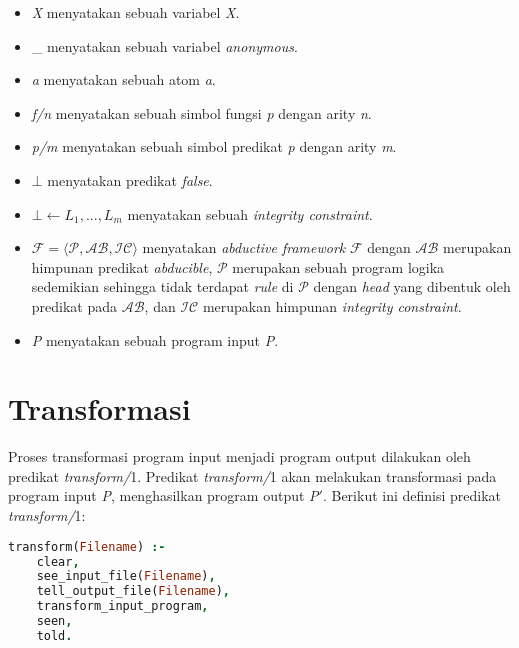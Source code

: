 \begin{itemize}
	\item \textit{X} menyatakan sebuah variabel \textit{X}.
	\item \_ menyatakan sebuah variabel \textit{anonymous}.
	\item \textit{a} menyatakan sebuah atom \textit{a}.
	\item \textit{f/}\textit{n} menyatakan sebuah simbol fungsi \textit{p} dengan arity \textit{n}.
	\item \textit{p/}\textit{m} menyatakan sebuah simbol predikat \textit{p} dengan arity \textit{m}.
	\item $\bot$ menyatakan predikat \textit{false}.
	\item $\bot \leftarrow L_1,...,L_m$ menyatakan sebuah \textit{integrity constraint}.
	\item $\mathcal{F} = \big \langle \mathcal{P}, \mathcal{AB}, \mathcal{IC} \big \rangle$ menyatakan \textit{abductive framework} $\mathcal{F}$ dengan $\mathcal{AB}$ merupakan himpunan predikat \textit{abducible}, $\mathcal{P}$ merupakan sebuah program logika sedemikian sehingga tidak terdapat \textit{rule} di $\mathcal{P}$ dengan \textit{head} yang dibentuk oleh predikat pada $\mathcal{AB}$, dan $\mathcal{IC}$ merupakan himpunan \textit{integrity constraint}.
	\item \textit{P} menyatakan sebuah program input \textit{P}.
\end{itemize}

\section{Transformasi}

Proses transformasi program input menjadi program output dilakukan oleh predikat \textit{transform/}1. Predikat \textit{transform/}1 akan melakukan transformasi pada program input \textit{P}, menghasilkan program output \textit{P$'$}. Berikut ini definisi predikat \textit{transform/}1: \\

\begin{lstlisting}[language=Prolog, caption=Definisi predikat \textit{transform}(\textit{Filename}),
tabsize=4,
frame=none,
captionpos=b]
transform(Filename) :-
	clear,
	see_input_file(Filename),
	tell_output_file(Filename),
	transform_input_program,
	seen,
	told.
\end{lstlisting}

